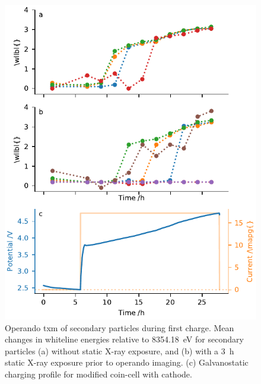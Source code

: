 \documentclass{article}
\begin{document}
\begin{figure}
  \includegraphics{figures/NCA-particles-irradiation.pdf}
  \caption{Operando \gls{txm} of secondary \nca{} particles during
    first charge. Mean changes in whiteline energies relative to
    \SI{8354.18}{eV} for secondary particles (a) without static X-ray
    exposure, and (b) with a \SI{3}{\hour} static X-ray exposure prior
    to operando imaging. (c) Galvanostatic charging profile for
    modified coin-cell with \nca{} cathode.}
  \label{fig:nca-irradiation}
\end{figure}
\end{document}
